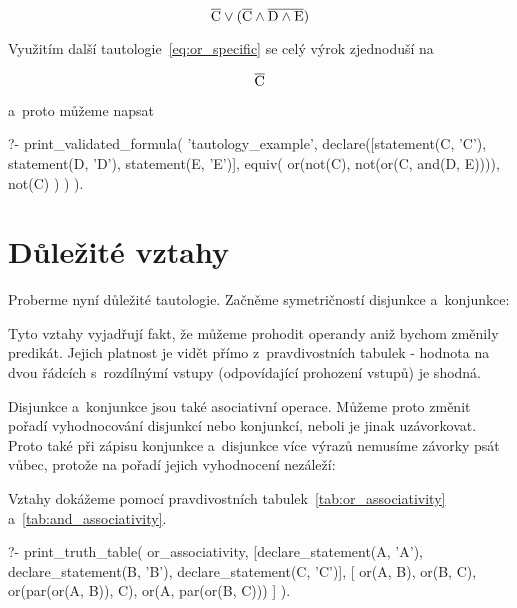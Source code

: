 \begin{equation}
\overline{\mathrm{C}} \lor (\overline{\mathrm{C}} \land \overline{\mathrm{D} \land \mathrm{E}})
\end{equation}

Využitím další tautologie~\eqref{eq:or_specific} se celý výrok zjednoduší na

\begin{equation}
\overline{\mathrm{C}}
\end{equation}

a~proto můžeme napsat

\begin{prolog}
?- print_validated_formula(
	'tautology_example',
	declare([statement(C, 'C'), statement(D, 'D'), statement(E, 'E')],
		equiv(
			or(not(C), not(or(C, and(D, E)))),
			not(C)
		)
	)
).
\end{prolog}

\section{Důležité vztahy}

Proberme nyní důležité tautologie. Začněme symetričností disjunkce a~konjunkce:


Tyto vztahy vyjadřují fakt, že můžeme prohodit operandy aniž bychom změnily predikát. Jejich platnost je vidět přímo z~pravdivostních tabulek - hodnota na dvou řádcích s~rozdílnýmí vstupy (odpovídající prohození vstupů) je shodná.

Disjunkce a~konjunkce jsou také asociativní operace. Můžeme proto změnit pořadí vyhodnocování disjunkcí nebo konjunkcí, neboli je jinak uzávorkovat. Proto také při zápisu konjunkce a~disjunkce více výrazů nemusíme závorky psát vůbec, protože na pořadí jejich vyhodnocení nezáleží:


Vztahy dokážeme pomocí pravdivostních tabulek~\ref{tab:or_associativity} a~\ref{tab:and_associativity}.

\begin{prolog}
?- print_truth_table(
	or_associativity,
	[declare_statement(A, 'A'), declare_statement(B, 'B'), declare_statement(C, 'C')],
	[
		or(A, B),
		or(B, C),
		or(par(or(A, B)), C),
		or(A, par(or(B, C)))
	]
).
\end{prolog}

